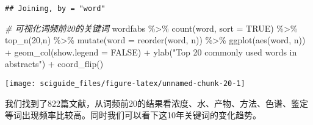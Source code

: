 \documentclass[]{tufte-book}
\newenvironment{Shaded}{}{}
\newcommand{\AttributeTok}[1]{\textcolor[rgb]{0.49,0.56,0.16}{#1}}
\newcommand{\CommentTok}[1]{\textcolor[rgb]{0.38,0.63,0.69}{\textit{#1}}}
\newcommand{\ConstantTok}[1]{\textcolor[rgb]{0.53,0.00,0.00}{#1}}
\newcommand{\DecValTok}[1]{\textcolor[rgb]{0.25,0.63,0.44}{#1}}
\newcommand{\FunctionTok}[1]{\textcolor[rgb]{0.02,0.16,0.49}{#1}}
\newcommand{\NormalTok}[1]{#1}
\newcommand{\SpecialCharTok}[1]{\textcolor[rgb]{0.25,0.44,0.63}{#1}}
\newcommand{\StringTok}[1]{\textcolor[rgb]{0.25,0.44,0.63}{#1}}
\begin{document}
\begin{verbatim}
## Joining, by = "word"
\end{verbatim}

\begin{Shaded}
\begin{Highlighting}[]
\CommentTok{\# 可视化词频前20的关键词}
\NormalTok{wordfabs }\SpecialCharTok{\%\textgreater{}\%}
        \FunctionTok{count}\NormalTok{(word, }\AttributeTok{sort =} \ConstantTok{TRUE}\NormalTok{) }\SpecialCharTok{\%\textgreater{}\%}
        \FunctionTok{top\_n}\NormalTok{(}\DecValTok{20}\NormalTok{,n) }\SpecialCharTok{\%\textgreater{}\%}
        \FunctionTok{mutate}\NormalTok{(}\AttributeTok{word =} \FunctionTok{reorder}\NormalTok{(word, n)) }\SpecialCharTok{\%\textgreater{}\%}
        \FunctionTok{ggplot}\NormalTok{(}\FunctionTok{aes}\NormalTok{(word, n)) }\SpecialCharTok{+}
  \FunctionTok{geom\_col}\NormalTok{(}\AttributeTok{show.legend =} \ConstantTok{FALSE}\NormalTok{) }\SpecialCharTok{+}
  \FunctionTok{ylab}\NormalTok{(}\StringTok{"Top 20 commonly used words in abstracts"}\NormalTok{) }\SpecialCharTok{+}
  \FunctionTok{coord\_flip}\NormalTok{()}
\end{Highlighting}
\end{Shaded}

\texttt{[image: sciguide\_files/figure-latex/unnamed-chunk-20-1]}

我们找到了822篇文献，从词频前20的结果看浓度、水、产物、方法、色谱、鉴定等词出现频率比较高。同时我们可以看下这10年关键词的变化趋势。
\end{document}
